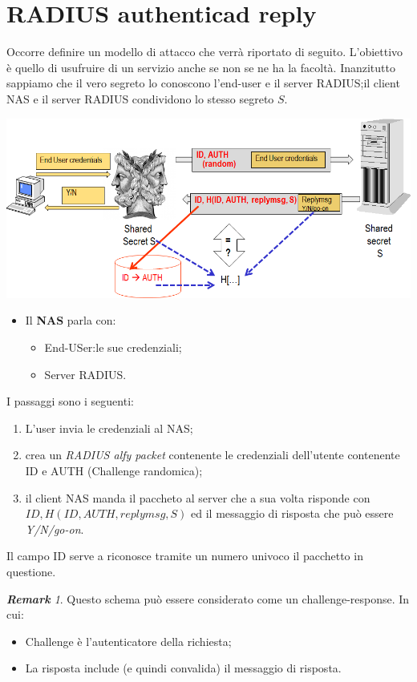 \documentclass{book}
\theoremstyle{remark}
\newtheorem*{remark}{\textbf{Remark}}
\begin{document}
\section{RADIUS authenticad reply}
Occorre definire un modello di attacco che verrà riportato di seguito\@. L'obiettivo è quello di usufruire di un servizio anche se non se ne ha la facoltà\@. Inanzitutto sappiamo che il vero segreto lo conoscono l'end-user e il server RADIUS;\@mentre il client NAS e il server RADIUS condividono lo stesso segreto \(S\)\@.
\begin{center}
	\includegraphics[scale=0.5]{AUTHREPLYRADIUS.png}
\end{center}
\begin{itemize}
	\item Il \textbf{NAS} parla con:\begin{itemize}
		      \item End-USer:\@invia le sue credenziali;\@
		      \item Server RADIUS\@.
	      \end{itemize}
\end{itemize}
I passaggi sono i seguenti:
\begin{enumerate}
	\item  L'user invia le credenziali al NAS;\@
	\item crea un \emph{RADIUS alfy packet} contenente le credenziali dell'utente contenente ID e AUTH (Challenge randomica);\@
	\item il client NAS manda il paccheto al server che a sua volta risponde con \emph{\(ID,H (ID,AUTH,replymsg,S)\)} ed il messaggio di risposta che può essere \emph{Y/N/go-on}\@.
\end{enumerate}
Il campo ID serve a riconosce tramite un numero univoco il pacchetto in questione\@.
\begin{remark}
	Questo schema può essere considerato come un challenge-response\@. In cui:\begin{itemize}
		\item Challenge è l'autenticatore della richiesta;\@
		\item La risposta include (e quindi convalida) il messaggio di risposta\@.
	\end{itemize}
\end{remark}
\end{document}
